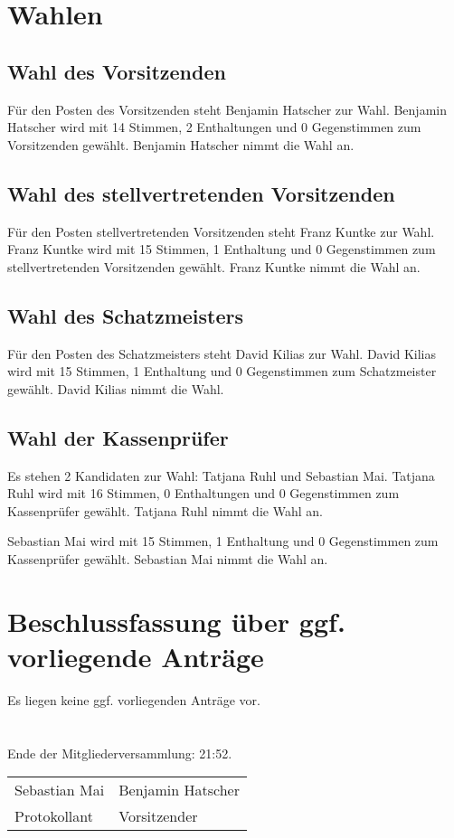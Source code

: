 \documentclass[a4paper,12pt,titlepage]{scrartcl}
\begin{document}
\section{Wahlen}

\subsection{Wahl des Vorsitzenden}

Für den Posten des Vorsitzenden steht Benjamin Hatscher zur Wahl.
Benjamin Hatscher wird mit 14 Stimmen, 2 Enthaltungen und 0 Gegenstimmen zum Vorsitzenden gewählt. Benjamin Hatscher nimmt die Wahl an.

\subsection{Wahl des stellvertretenden Vorsitzenden}

Für den Posten stellvertretenden Vorsitzenden steht Franz Kuntke zur Wahl.
Franz Kuntke wird mit 15 Stimmen, 1 Enthaltung und 0 Gegenstimmen zum stellvertretenden Vorsitzenden gewählt. Franz Kuntke nimmt die Wahl an.

\subsection{ Wahl des Schatzmeisters}

Für den Posten des Schatzmeisters steht David Kilias zur Wahl. David Kilias wird mit 15 Stimmen, 1 Enthaltung und 0 Gegenstimmen zum Schatzmeister gewählt. David Kilias nimmt die Wahl.

\subsection{ Wahl der Kassenprüfer}

Es stehen 2 Kandidaten zur Wahl: Tatjana Ruhl und Sebastian Mai.
Tatjana Ruhl wird mit 16 Stimmen, 0 Enthaltungen und 0 Gegenstimmen zum Kassenprüfer gewählt. Tatjana Ruhl nimmt die Wahl an.

Sebastian Mai wird mit 15 Stimmen, 1 Enthaltung und 0 Gegenstimmen zum Kassenprüfer gewählt. Sebastian Mai nimmt die Wahl an.


\section{Beschlussfassung über ggf. vorliegende Anträge}

Es liegen keine ggf. vorliegenden Anträge vor.

\section*{}
Ende der Mitgliederversammlung: 21:52.


\nopagebreak
\vspace{10\baselineskip}
\begin{tabularx}{\textwidth}[b]{X X}
	\hline
	Sebastian Mai  & Benjamin Hatscher \\
	Protokollant & Vorsitzender
\end{tabularx}

\appendix
%
\end{document}
